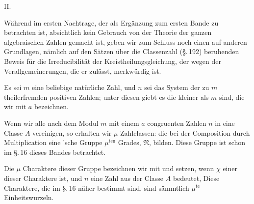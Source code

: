 
\begin{center}
II.

\end{center}

Während im ersten Nachtrage, der als Ergänzung zum ersten Bande zu betrachten
ist, absichtlich kein Gebrauch von der Theorie der ganzen algebraischen Zahlen
gemacht ist, geben wir zum Schluss noch einen auf anderen Grundlagen, nämlich
auf den Sätzen über die Classenzahl (\S.\,192) beruhenden Beweis für die
Irreducibilität der Kreistheilungsgleichung, der wegen der Verallgemeinerungen,
die er zulässt, merkwürdig ist.

Es sei $m$ eine beliebige natürliche Zahl, und $n$ sei das System der zu $m$
theilerfremden positiven Zahlen; unter diesen giebt es
die kleiner als $m$ sind, die wir mit $a$ bezeichnen.

Wenn wir alle nach dem Modul $m$ mit einem $a$ congruenten Zahlen $n$ in eine
Classe $A$ vereinigen, so erhalten wir $\mu$ Zahlclassen:
die bei der Composition durch Multiplication eine 'sche Gruppe
$\mu^{\text{ten}}$ Grades, $\mathfrak{N}$, bilden. Diese Gruppe ist schon im
\S.\,16 dieses Bandes betrachtet.

Die $\mu$ Charaktere dieser Gruppe bezeichnen wir mit
und setzen, wenn $\chi$ einer dieser Charaktere ist, und $n$ eine Zahl aus der
Classe $A$ bedeutet,
Diese Charaktere, die im \S.\,16 näher bestimmt sind, sind sämmtlich
$\mu^{\text{te}}$ Einheitswurzeln.

